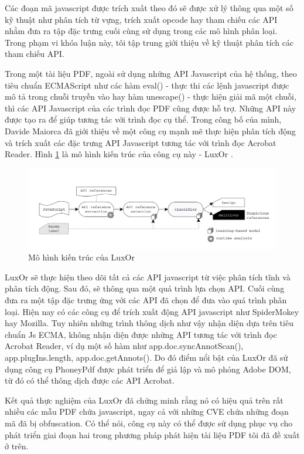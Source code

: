 \documentclass[./../main.tex]{subfiles}
\begin{document}
Các đoạn mã javascript được trích xuất theo đó sẽ được xử lý thông qua một số kỹ thuật như phân tích từ vựng, trích xuất opcode hay tham chiếu các API nhằm đưa ra tập đặc trưng cuối cùng sử dụng trong các mô hình phân loại. Trong phạm vi khóa luận này, tôi tập trung giới thiệu về kỹ thuật phân tích các tham chiếu API.

Trong một tài liệu PDF, ngoài sử dụng những API Javascript của hệ thống, theo tiêu chuẩn ECMAScript như các hàm eval() - thực thi các lệnh javascript được mô tả trong chuỗi truyền vào hay hàm unescape() - thực hiện giải mã một chuỗi, thì các API Javascript của các trình đọc PDF cũng được hỗ trợ. Những API này được tạo ra để giúp tương tác với trình đọc cụ thể. Trong công bố của mình, Davide Maiorca đã giới thiệu về một công cụ mạnh mẽ thực hiện phân tích động và trích xuất các đặc trưng API Javascript tương tác với trình đọc Acrobat Reader. Hình \ref{fig:luxor} là mô hình kiến trúc của công cụ này - LuxOr \cite{luxor}.

\begin{figure}[H]
	\centering
	\includegraphics[width=\linewidth]{./images/luxOr.png}
	\caption{Mô hình kiến trúc của LuxOr \cite{luxor}}
	\label{fig:luxor}
\end{figure}

LuxOr sẽ thực hiện theo dõi tất cả các API javascript từ việc phân tích tĩnh và phân tích động. Sau đó, sẽ thông qua một quá trình lựa chọn API. Cuối cùng đưa ra một tập đặc trưng ứng với các API đã chọn để đưa vào quá trình phân loại. Hiện nay có các công cụ để trích xuất động API javascript như SpiderMokey hay Mozilla. Tuy nhiên những trình thông dịch như vậy nhận diện dựa trên tiêu chuẩn Js ECMA, không nhận diện được những API tương tác với trình đọc Acrobat Reader, ví dụ một số hàm như app.doc.syncAnnotScan(), app.plugIns.length, app.doc.getAnnots(). Do đó điểm nổi bật của LuxOr đã sử dụng công cụ PhoneyPdf được phát triển để giả lập và mô phỏng Adobe DOM, từ đó có thể thông dịch được các API Acrobat.

Kết quả thực nghiệm của LuxOr đã chứng minh rằng nó có hiệu quả trên rất nhiều các mẫu PDF chứa javascript, ngay cả với những CVE chứa những đoạn mã đã bị obfuscation. Có thể nói, công cụ này có thể được sử dụng phục vụ cho phát triển giai đoạn hai trong phương pháp phát hiện tài liệu PDF tôi đã đề xuất ở trên.
\end{document}
